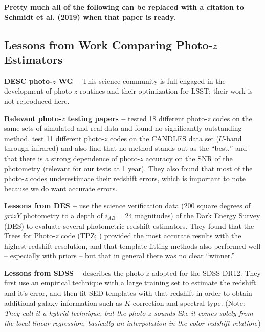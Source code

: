 \documentclass[DM,lsstdraft,toc]{lsstdoc}
\begin{document}
{\bf Pretty much all of the following can be replaced with a citation to Schmidt et al. (2019) when that paper is ready.} 

\subsection{Lessons from Work Comparing Photo-$z$ Estimators}\label{ssec:sel_lit}

\textbf{DESC photo-$z$ WG --} This science community is full engaged in the development of photo-$z$ routines and their optimization for LSST; their work is not reproduced here.

\textbf{Relevant photo-$z$ testing papers --} \cite{2010A&A...523A..31H} tested 18 different photo-$z$ codes on the same sets of simulated and real data and found no significantly outstanding method. \cite{2013ApJ...775...93D} test 11 different photo-$z$ codes on the CANDLES data set ($U$-band through infrared) and also find that no method stands out as the ``best,'' and that there is a strong dependence of photo-$z$ accuracy on the SNR of the photometry (relevant for our tests at 1 year). They also found that most of the photo-$z$ codes underestimate their redshift errors, which is important to note because we do want accurate errors.

\textbf{Lessons from DES --} \cite{2014MNRAS.445.1482S} use the science verification data (200 square degrees of $grizY$ photometry to a depth of $i_{AB}=24$ magnitudes) of the Dark Energy Survey (DES) to evaluate several photometric redshift estimators. They found that the Trees for Photo-$z$ code (TPZ; \citealt{2013ascl.soft04011C}) provided the most accurate results with the highest redshift resolution, and that template-fitting methods also performed well -- especially with priors -- but that in general there was no clear ``winner.''

\textbf{Lessons from SDSS --} \cite{2016MNRAS.460.1371B} describes the photo-$z$ adopted for the SDSS DR12. They first use an empirical technique with a large training set to estimate the redshift and it's error, and then fit SED templates with that redshift in order to obtain additional galaxy information such as $K$-correction and spectral type. (Note: \textit{They call it a hybrid technique, but the photo-$z$ sounds like it comes solely from the local linear regression, basically an interpolation in the color-redshift relation}.)
\end{document}
